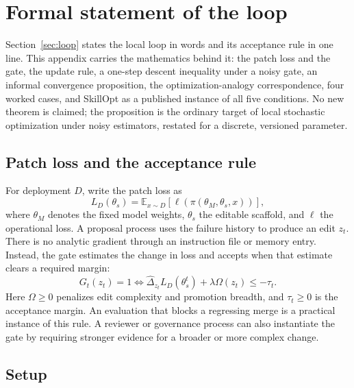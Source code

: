 \section{Formal statement of the loop}\label{app:formal}

Section~\ref{sec:loop} states the local loop in words and its acceptance rule in one line. This appendix carries the mathematics behind it: the patch loss and the gate, the update rule, a one-step descent inequality under a noisy gate, an informal convergence proposition, the optimization-analogy correspondence, four worked cases, and SkillOpt as a published instance of all five conditions. No new theorem is claimed; the proposition is the ordinary target of local stochastic optimization under noisy estimators, restated for a discrete, versioned parameter.

\subsection{Patch loss and the acceptance rule}\label{patch-loss-and-the-acceptance-rule}

For deployment \(D\), write the patch loss as \[L_D(\theta_s)=\mathbb{E}_{x\sim D}\!\left[\ell(\pi(\theta_M,\theta_s,x))\right],\] where \(\theta_M\) denotes the fixed model weights, \(\theta_s\) the editable scaffold, and \(\ell\) the operational loss. A proposal process uses the failure history to produce an edit \(z_t\). There is no analytic gradient through an instruction file or memory entry. Instead, the gate estimates the change in loss and accepts when that estimate clears a required margin: \[G_t(z_t)=1\iff\widehat{\Delta}_{z_t}L_D(\theta_s^t)+\lambda\Omega(z_t)\leq-\tau_t.\] Here \(\Omega\geq0\) penalizes edit complexity and promotion breadth, and \(\tau_t\geq0\) is the acceptance margin. An evaluation that blocks a regressing merge is a practical instance of this rule. A reviewer or governance process can also instantiate the gate by requiring stronger evidence for a broader or more complex change.

\subsection{Setup}\label{setup}

